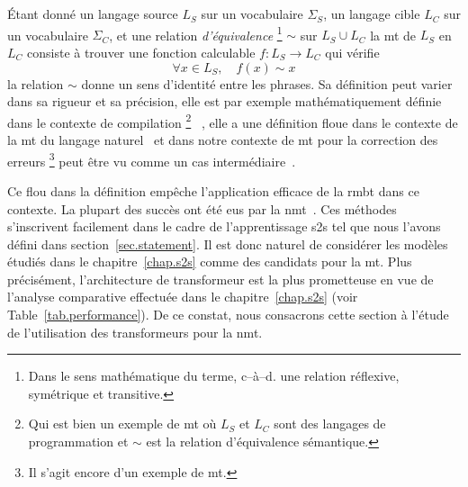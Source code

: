 \section{}

Étant donné un langage source \(L_S\) sur un vocabulaire \(\Sigma_S\),
un langage cible \(L_C\) sur un vocabulaire \(\Sigma_C\),
et une relation \emph{d'équivalence}%
\footnote{Dans le sens mathématique du terme, c--à--d. une relation réflexive, symétrique et transitive.} %
\(\sim\) sur \(L_S \cup L_C\) %
la \gls{mt} de \(L_S\) en \(L_C\) consiste à trouver une fonction calculable \(f : L_S \rightarrow L_C\)
qui vérifie 
\begin{equation}
    \label{eq:mt-equivalence}
    \forall x \in L_S, \quad f(x) \sim x
\end{equation}
la relation \(\sim\) donne un sens d'identité entre les phrases.
Sa définition peut varier dans sa rigueur et sa précision,
elle est par exemple mathématiquement définie dans le contexte de compilation%
\footnote{Qui est bien un exemple de \gls{mt} où \(L_S\) et \(L_C\) sont des langages de programmation
et \(\sim\) est la relation d'équivalence sémantique.}%
~\cite{Hadj_2015},
elle a une définition floue dans le contexte de la \gls{mt} du langage naturel~\cite{routledge}
et dans notre contexte de \gls{mt} pour la correction des erreurs%
\footnote{Il s'agit encore d'un exemple de \gls{mt}.} %
peut être vu comme un cas intermédiaire~\cite{Bryant_Yuan_Qorib_Cao_Ng_Briscoe_2022}.

Ce flou dans la définition empêche l'application efficace de la \gls{rmbt} dans ce contexte.
La plupart des succès ont été eus par la \gls{nmt}~\cite{deep-nmt-survey}.
Ces méthodes s'inscrivent facilement dans le cadre de l'apprentissage \gls{s2s} 
tel que nous l'avons défini dans section~\ref{sec.statement}.
Il est donc naturel de considérer les modèles étudiés dans le chapitre~\ref{chap.s2s} 
comme des candidats pour la \gls{mt}.
Plus précisément, l'architecture de transformeur est la plus prometteuse en vue de l'analyse comparative
effectuée dans le chapitre~\ref{chap.s2s} (voir Table~\ref{tab.performance}).
De ce constat, nous consacrons cette section à l'étude de l'utilisation des transformeurs pour la \gls{nmt}.





